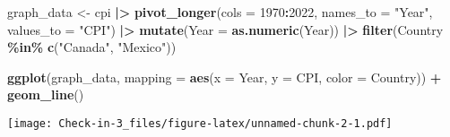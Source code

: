 \documentclass[
]{article}
\newenvironment{Shaded}{\begin{snugshade}}{\end{snugshade}}
\newcommand{\AttributeTok}[1]{\textcolor[rgb]{0.13,0.29,0.53}{#1}}
\newcommand{\FunctionTok}[1]{\textcolor[rgb]{0.13,0.29,0.53}{\textbf{#1}}}
\newcommand{\NormalTok}[1]{#1}
\newcommand{\OtherTok}[1]{\textcolor[rgb]{0.56,0.35,0.01}{#1}}
\newcommand{\SpecialCharTok}[1]{\textcolor[rgb]{0.81,0.36,0.00}{\textbf{#1}}}
\newcommand{\StringTok}[1]{\textcolor[rgb]{0.31,0.60,0.02}{#1}}
\begin{document}
\begin{Shaded}
\begin{Highlighting}[]
\NormalTok{graph\_data }\OtherTok{\textless{}{-}}\NormalTok{ cpi }\SpecialCharTok{|\textgreater{}}
  \FunctionTok{pivot\_longer}\NormalTok{(}\AttributeTok{cols =} \StringTok{\textasciigrave{}}\AttributeTok{1970}\StringTok{\textasciigrave{}}\SpecialCharTok{:}\StringTok{\textasciigrave{}}\AttributeTok{2022}\StringTok{\textasciigrave{}}\NormalTok{,}
               \AttributeTok{names\_to =} \StringTok{"Year"}\NormalTok{, }
               \AttributeTok{values\_to =} \StringTok{"CPI"}\NormalTok{) }\SpecialCharTok{|\textgreater{}}
  \FunctionTok{mutate}\NormalTok{(}\AttributeTok{Year =} \FunctionTok{as.numeric}\NormalTok{(Year)) }\SpecialCharTok{|\textgreater{}}
  \FunctionTok{filter}\NormalTok{(Country }\SpecialCharTok{\%in\%} \FunctionTok{c}\NormalTok{(}\StringTok{"Canada"}\NormalTok{, }\StringTok{"Mexico"}\NormalTok{))}

\FunctionTok{ggplot}\NormalTok{(graph\_data, }\AttributeTok{mapping =} \FunctionTok{aes}\NormalTok{(}\AttributeTok{x =}\NormalTok{ Year, }\AttributeTok{y =}\NormalTok{ CPI, }\AttributeTok{color =}\NormalTok{ Country)) }\SpecialCharTok{+}
  \FunctionTok{geom\_line}\NormalTok{()}
\end{Highlighting}
\end{Shaded}

\texttt{[image: Check-in-3\_files/figure-latex/unnamed-chunk-2-1.pdf]}
\end{document}
